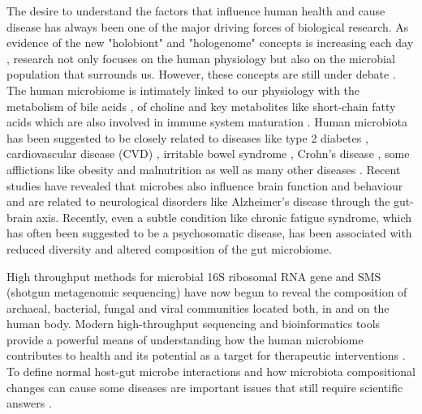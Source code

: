 The desire to understand the factors that influence human health and cause disease has always been one of the major driving forces of biological research. As evidence of the new "holobiont"  and "hologenome" concepts is increasing each day \cite{holo1, holo2}, research not only focuses on the human physiology but also on the microbial population that surrounds us. However, these concepts are still under debate \cite{holo3}. The human microbiome is intimately linked to our physiology with the metabolism of bile acids \cite{bileacids}, of choline \cite{choline} and key metabolites like short-chain fatty acids \cite{scfa1, scfa2} which are also involved in immune system maturation \cite{scfa3, scfa4}. Human microbiota has been suggested to be closely related to diseases like type 2 diabetes \cite{diabetes2}, cardiovascular disease (CVD) \cite{CVD}, irritable bowel syndrome \cite{IBS}, Crohn's disease \cite{CD}, some afflictions like obesity \cite{ob1, ob2} and malnutrition \cite{nutr} as well as many other diseases \cite{Moya_trends}. Recent studies have revealed that microbes also influence brain function and behaviour and are related to neurological disorders like Alzheimer's disease through the gut-brain axis\cite{mind,AD}. Recently, even a subtle condition like chronic fatigue syndrome, which has often been suggested to be a psychosomatic disease, has been associated with reduced diversity and altered composition of the gut microbiome\cite{CFS}. 

High throughput methods for microbial 16S ribosomal RNA gene and SMS (shotgun metagenomic sequencing) have now begun to reveal the composition of archaeal, bacterial, fungal and viral communities located both, in and on the human body. Modern high-throughput sequencing and bioinformatics tools provide a powerful means of understanding how the human microbiome contributes to health and its potential as a target for therapeutic interventions \cite{microb&health}. To define normal host-gut microbe interactions and how microbiota compositional changes can cause some diseases are important issues that still require scientific answers \cite{normal1, normal2, panthropology}.

